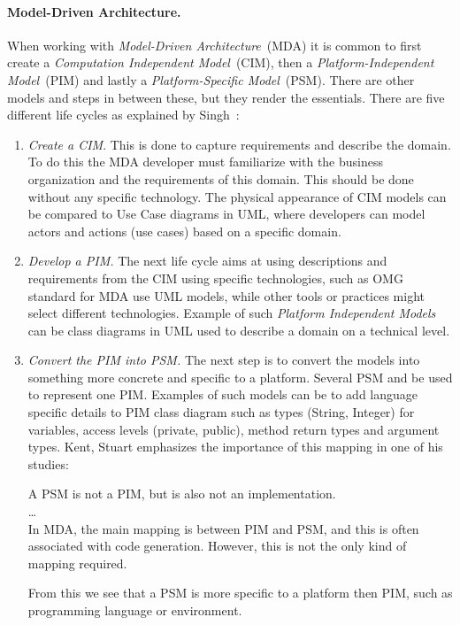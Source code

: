 \paragraph{Model-Driven Architecture.}
When working with \emph{Model-Driven Architecture}~(MDA) it is common to first create a
\emph{Computation Independent Model}~(CIM), then a \emph{Platform-Independent Model}~(PIM) and
lastly a \emph{Platform-Specific Model}~(PSM). There are other models and steps in between these,
but they render the essentials.
There are five different life cycles as explained by Singh~\cite{model-driven:singh09}:
\begin{enumerate}
  \item \emph{Create a CIM}.
    This is done to capture requirements and describe the domain.
    To do this the MDA developer must familiarize with the business organization
    and the requirements of this domain. This should be done without any specific technology.
    The physical appearance of CIM models can be compared to Use Case diagrams in UML,
    where developers can model actors and actions (use cases) based on a specific domain.
  \item \emph{Develop a PIM.}
    The next life cycle aims at using descriptions and requirements from the CIM
    using specific technologies, such as OMG standard for MDA use UML models,
    while other tools or practices might select different technologies.
    Example of such \emph{Platform Independent Models} can be class diagrams in UML
    used to describe a domain on a technical level.
  \item \emph{Convert the PIM into PSM.}
    The next step is to convert the models into something more concrete
    and specific to a platform. Several PSM and be used to represent one PIM.
    Examples of such models can be to add language specific details to PIM class
    diagram such as types (String, Integer) for variables, access levels (private, public),
    method return types and argument types.
    Kent, Stuart emphasizes the importance of this mapping in one of his studies:
    \epigraph{
      A PSM is not a PIM, but is also not an implementation. \\
      \ldots \\
      In MDA, the main mapping is between PIM
      and PSM, and this is often associated with code generation. 
      However, this is not the only kind of mapping required.
    }{}
    From this we see that a PSM is more specific to a platform then PIM, such as 
    programming language or environment.

\end{enumerate}
